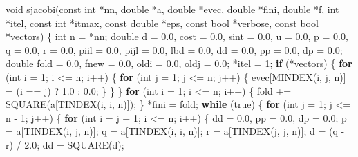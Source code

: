 \documentclass[12pt,]{article}
\newenvironment{Shaded}{\begin{snugshade}}{\end{snugshade}}
\newcommand{\ControlFlowTok}[1]{\textcolor[rgb]{0.13,0.29,0.53}{\textbf{#1}}}
\newcommand{\DataTypeTok}[1]{\textcolor[rgb]{0.13,0.29,0.53}{#1}}
\newcommand{\DecValTok}[1]{\textcolor[rgb]{0.00,0.00,0.81}{#1}}
\newcommand{\FloatTok}[1]{\textcolor[rgb]{0.00,0.00,0.81}{#1}}
\newcommand{\NormalTok}[1]{#1}
\begin{document}
\begin{Shaded}
\begin{Highlighting}[]
{{{{{{{{\DataTypeTok{void}\NormalTok{ sjacobi(}\DataTypeTok{const} \DataTypeTok{int}\NormalTok{ *nn, }\DataTypeTok{double}\NormalTok{ *a, }\DataTypeTok{double}\NormalTok{ *evec, }\DataTypeTok{double}\NormalTok{ *fini, }\DataTypeTok{double}\NormalTok{ *f,}
             \DataTypeTok{int}\NormalTok{ *itel, }\DataTypeTok{const} \DataTypeTok{int}\NormalTok{ *itmax, }\DataTypeTok{const} \DataTypeTok{double}\NormalTok{ *eps,}
             \DataTypeTok{const} \DataTypeTok{bool}\NormalTok{ *verbose, }\DataTypeTok{const} \DataTypeTok{bool}\NormalTok{ *vectors) \{}
  \DataTypeTok{int}\NormalTok{ n = *nn;}
  \DataTypeTok{double}\NormalTok{ d = }\FloatTok{0.0}\NormalTok{, cost = }\FloatTok{0.0}\NormalTok{, sint = }\FloatTok{0.0}\NormalTok{, u = }\FloatTok{0.0}\NormalTok{, p = }\FloatTok{0.0}\NormalTok{, q = }\FloatTok{0.0}\NormalTok{, r = }\FloatTok{0.0}\NormalTok{,}
\NormalTok{         piil = }\FloatTok{0.0}\NormalTok{, pijl = }\FloatTok{0.0}\NormalTok{, lbd = }\FloatTok{0.0}\NormalTok{, dd = }\FloatTok{0.0}\NormalTok{, pp = }\FloatTok{0.0}\NormalTok{, dp = }\FloatTok{0.0}\NormalTok{;}
  \DataTypeTok{double}\NormalTok{ fold = }\FloatTok{0.0}\NormalTok{, fnew = }\FloatTok{0.0}\NormalTok{, oldi = }\FloatTok{0.0}\NormalTok{, oldj = }\FloatTok{0.0}\NormalTok{;}
\NormalTok{  *itel = }\DecValTok{1}\NormalTok{;}
  \ControlFlowTok{if}\NormalTok{ (*vectors) \{}
    \ControlFlowTok{for}\NormalTok{ (}\DataTypeTok{int}\NormalTok{ i = }\DecValTok{1}\NormalTok{; i <= n; i++) \{}
      \ControlFlowTok{for}\NormalTok{ (}\DataTypeTok{int}\NormalTok{ j = }\DecValTok{1}\NormalTok{; j <= n; j++) \{}
\NormalTok{        evec[MINDEX(i, j, n)] = (i == j) ? }\FloatTok{1.0}\NormalTok{ : }\FloatTok{0.0}\NormalTok{;}
\NormalTok{      \}}
\NormalTok{    \}}
\NormalTok{  \}}
  \ControlFlowTok{for}\NormalTok{ (}\DataTypeTok{int}\NormalTok{ i = }\DecValTok{1}\NormalTok{; i <= n; i++) \{}
\NormalTok{    fold += SQUARE(a[TINDEX(i, i, n)]);}
\NormalTok{  \}}
\NormalTok{  *fini = fold;}
  \ControlFlowTok{while}\NormalTok{ (true) \{}
    \ControlFlowTok{for}\NormalTok{ (}\DataTypeTok{int}\NormalTok{ j = }\DecValTok{1}\NormalTok{; j <= n - }\DecValTok{1}\NormalTok{; j++) \{}
      \ControlFlowTok{for}\NormalTok{ (}\DataTypeTok{int}\NormalTok{ i = j + }\DecValTok{1}\NormalTok{; i <= n; i++) \{}
\NormalTok{        dd = }\FloatTok{0.0}\NormalTok{, pp = }\FloatTok{0.0}\NormalTok{, dp = }\FloatTok{0.0}\NormalTok{;}
\NormalTok{        p = a[TINDEX(i, j, n)];}
\NormalTok{        q = a[TINDEX(i, i, n)];}
\NormalTok{        r = a[TINDEX(j, j, n)];}
\NormalTok{        d = (q - r) / }\FloatTok{2.0}\NormalTok{;}
\NormalTok{        dd = SQUARE(d);}
}}}}}}}}
\end{Highlighting}
\end{Shaded}
\end{document}
